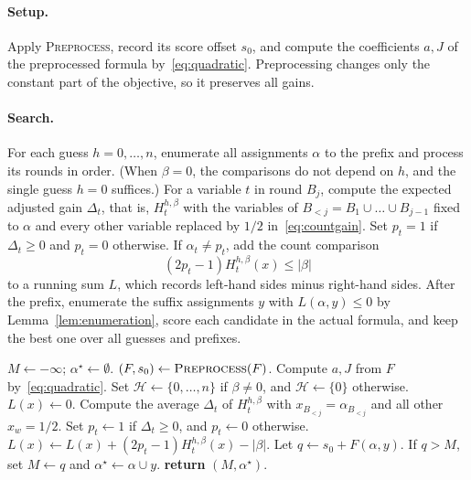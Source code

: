 \documentclass[11pt,a4paper]{article}
\theoremstyle{definition}
\theoremstyle{remark}
\begin{document}
\paragraph{Setup.}
Apply \textnormal{\textsc{Preprocess}}, record its score offset $s_0$, and
compute the coefficients $a,J$ of the preprocessed formula
by~\eqref{eq:quadratic}. Preprocessing changes only the constant part of the
objective, so it preserves all gains.

\paragraph{Search.}
For each guess $h=0,\ldots,n$, enumerate all assignments $\alpha$ to the
prefix and process its rounds in order. (When $\beta=0$, the comparisons do
not depend on $h$, and the single guess $h=0$ suffices.) For a variable $t$
in round $B_j$, compute the expected adjusted gain $\Delta_t$, that is,
$H_t^{h,\beta}$ with the variables of $B_{<j}=B_1\cup\dots\cup B_{j-1}$
fixed to $\alpha$ and every other variable replaced by $1/2$
in~\eqref{eq:countgain}. Set $p_t=1$ if $\Delta_t\ge0$ and $p_t=0$
otherwise. If $\alpha_t\ne p_t$, add the count comparison
\[
 (2p_t-1)H_t^{h,\beta}(x)\le|\beta|
\]
to a running sum $L$, which records left-hand sides minus right-hand sides.
After the prefix, enumerate the suffix assignments $y$ with
$L(\alpha,y)\le0$ by Lemma~\ref{lem:enumeration}, score each candidate in the
actual formula, and keep the best one over all guesses and prefixes.

\begin{algorithm}[tp]
\caption{\textnormal{\textsc{CountComparisons}}$(F,\beta,B_1,\ldots,B_\ell)$}
\label{alg:counts}
\begin{algorithmic}[1]
\STATE $M\gets-\infty$; $\alpha^\star\gets\emptyset$.
\STATE $(F,s_0)\gets\textnormal{\textsc{Preprocess}}(F)$.
\STATE Compute $a,J$ from $F$ by~\eqref{eq:quadratic}.
\STATE Set $\mathcal H\gets\{0,\ldots,n\}$ if $\beta\ne0$, and $\mathcal H\gets\{0\}$ otherwise.
    \STATE $L(x)\gets0$.
      \STATE Compute the average $\Delta_t$ of $H_t^{h,\beta}$ with $x_{B_{<j}}=\alpha_{B_{<j}}$ and all other $x_w=1/2$.
      \STATE Set $p_t\gets1$ if $\Delta_t\ge0$, and $p_t\gets0$ otherwise.
        \STATE $L(x)\gets L(x)+(2p_t-1)H_t^{h,\beta}(x)-|\beta|$.
      \ENDIF
    \ENDFOR
      \STATE Let $q\gets s_0+F(\alpha,y)$.
      \STATE If $q>M$, set $M\gets q$ and $\alpha^\star\gets\alpha\cup y$.
    \ENDFOR
  \ENDFOR
\ENDFOR
\STATE \textbf{return} $(M,\alpha^\star)$.
\end{algorithmic}
\end{algorithm}
\end{document}
